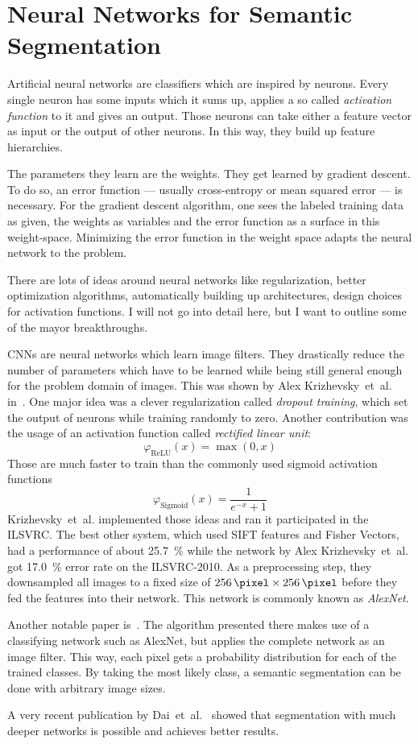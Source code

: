 
\section{Neural Networks for Semantic Segmentation}

Artificial neural networks are classifiers which are inspired by neurons.
Every single neuron has some inputs which it sums up, applies a so called
\textit{activation function} to it and gives an output. Those neurons can take
either a feature vector as input or the output of other neurons. In this way,
they build up feature hierarchies.

The parameters they learn are the weights. They get learned by gradient
descent. To do so, an error function --- usually cross-entropy or mean squared
error --- is necessary. For the gradient descent algorithm, one sees the
labeled training data as given, the weights as variables and the error function
as a surface in this weight-space. Minimizing the error function in the weight
space adapts the neural network to the problem.

There are lots of ideas around neural networks like regularization, better
optimization algorithms, automatically building up architectures, design
choices for activation functions. I will not go into detail here, but I want to
outline some of the mayor breakthroughs.

\Glspl{CNN} are neural networks which learn image filters. They drastically
reduce the number of parameters which have to be learned while being still
general enough for the problem domain of images. This was shown by Alex
Krizhevsky~et~al. in~\cite{krizhevsky2012imagenet}. One major idea was a clever
regularization called \textit{dropout training}, which set the output of neurons
while training randomly to zero. Another contribution was the usage of an activation
function called \textit{rectified linear unit}:
\[\varphi_{\text{ReLU}}(x) = \max(0, x)\]
Those are much faster to train than the commonly used sigmoid activation functions
\[\varphi_{\text{Sigmoid}}(x) = \frac{1}{e^{-x} + 1}\]
Krizhevsky~et~al. implemented those ideas and ran it participated in the
\gls{ILSVRC}. The best other system, which used SIFT features and Fisher
Vectors, had a performance of about \SI{25.7}{\percent} while the network by
Alex Krizhevsky~et~al. got \SI{17.0}{\percent} error rate on the ILSVRC-2010.
As a preprocessing step, they downsampled all images to a fixed
size of $\SI{256}{\pixel} \times \SI{256}{\pixel}$ before they fed the features
into their network. This network is commonly known as \textit{AlexNet}.

Another notable paper is~\cite{long2014fully}. The algorithm presented there
makes use of a classifying network such as AlexNet, but applies the complete
network as an image filter. This way, each pixel gets a probability
distribution for each of the trained classes. By taking the most likely class,
a semantic segmentation can be done with arbitrary image sizes.

A very recent publication by Dai~et~al.~\cite{dai2015instance} showed that
segmentation with much deeper networks is possible and achieves better results.
